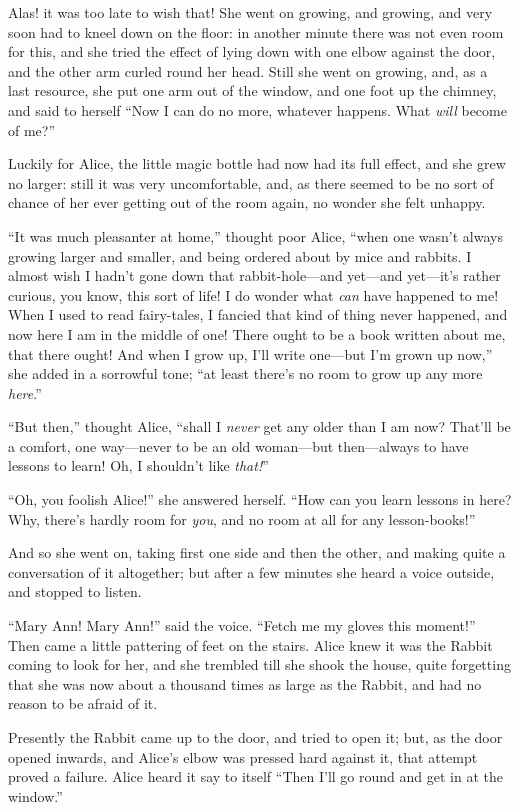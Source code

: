 \documentclass[11pt,openany,oneside]{book}
\begin{document}
Alas! it was too late to wish that! She went on growing, and growing, and very soon had to kneel down on the floor: in another minute there was not even room for this, and she tried the effect of lying down with one elbow against the door, and the other arm curled round her head. Still she went on growing, and, as a last resource, she put one arm out of the window, and one foot up the chimney, and said to herself “Now I can do no more, whatever happens. What {\em will\/} become of me?” 

Luckily for Alice, the little magic bottle had now had its full effect, and she grew no larger: still it was very uncomfortable, and, as there seemed to be no sort of chance of her ever getting out of the room again, no wonder she felt unhappy. 

“It was much pleasanter at home,” thought poor Alice, “when one wasn’t always growing larger and smaller, and being ordered about by mice and rabbits. I almost wish I hadn’t gone down that rabbit-hole—and yet—and yet—it’s rather curious, you know, this sort of life! I do wonder what {\em can\/} have happened to me! When I used to read fairy-tales, I fancied that kind of thing never happened, and now here I am in the middle of one! There ought to be a book written about me, that there ought! And when I grow up, I’ll write one—but I’m grown up now,” she added in a sorrowful tone; “at least there’s no room to grow up any more {\em here\/}.” 

“But then,” thought Alice, “shall I {\em never\/} get any older than I am now? That’ll be a comfort, one way—never to be an old woman—but then—always to have lessons to learn! Oh, I shouldn’t like {\em that!\/}” 

“Oh, you foolish Alice!” she answered herself. “How can you learn lessons in here? Why, there’s hardly room for {\em you\/}, and no room at all for any lesson-books!” 

And so she went on, taking first one side and then the other, and making quite a conversation of it altogether; but after a few minutes she heard a voice outside, and stopped to listen. 

“Mary Ann! Mary Ann!” said the voice. “Fetch me my gloves this moment!” Then came a little pattering of feet on the stairs. Alice knew it was the Rabbit coming to look for her, and she trembled till she shook the house, quite forgetting that she was now about a thousand times as large as the Rabbit, and had no reason to be afraid of it. 

Presently the Rabbit came up to the door, and tried to open it; but, as the door opened inwards, and Alice’s elbow was pressed hard against it, that attempt proved a failure. Alice heard it say to itself “Then I’ll go round and get in at the window.” 
\end{document}
